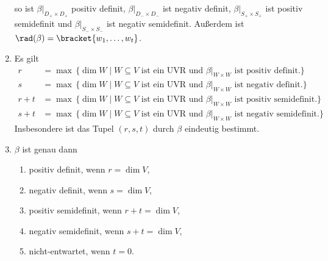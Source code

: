 \begin{corollary}
\begin{enumerate}[leftmargin=*, label=\roman*)]
      so ist $\beta|_{D_+ \times D_+}$ positiv definit, $\beta|_{D_- \times D_-}$ ist negativ definit, $\beta|_{S_+ \times S_+}$ ist positiv semidefinit und $\beta|_{S_- \times S_-}$ ist negativ semidefinit.
      Außerdem ist $\rad(\beta) = \bracket{w_1, \dotsc, w_t}$.
    \item
      Es gilt
      \begin{align*}
        r
        &=
        \max\,
        \{
          \dim W
          \mid
          \text{$W \subseteq V$ ist ein UVR und $\beta|_{W \times W}$ ist positiv definit}.
        \}
        \\
        s
        &=
        \max\,
        \{
          \dim W
          \mid
          \text{$W \subseteq V$ ist ein UVR und $\beta|_{W \times W}$ ist negativ definit}.
        \}
        \\
        r+t
        &=
        \max\,
        \{
          \dim W
          \mid
          \text{$W \subseteq V$ ist ein UVR und $\beta|_{W \times W}$ ist positiv semidefinit}.
        \}
        \\
        s+t
        &=
        \max\,
        \{
          \dim W
          \mid
          \text{$W \subseteq V$ ist ein UVR und $\beta|_{W \times W}$ ist negativ semidefinit}.
        \}
      \end{align*}
      Insbesondere ist das Tupel $(r,s,t)$ durch $\beta$ eindeutig bestimmt.
    \item
      $\beta$ ist genau dann
      \begin{enumerate}[leftmargin=*, label=\alph*)]
        \item
          positiv definit, wenn $r = \dim V$,
        \item
          negativ definit, wenn $s = \dim V$,
        \item
          positiv semidefinit, wenn $r + t = \dim V$,
        \item
          negativ semidefinit, wenn $s + t = \dim V$,
        \item
          nicht-entwartet, wenn $t = 0$.
      \end{enumerate}
  \end{enumerate}
\end{corollary}




















































